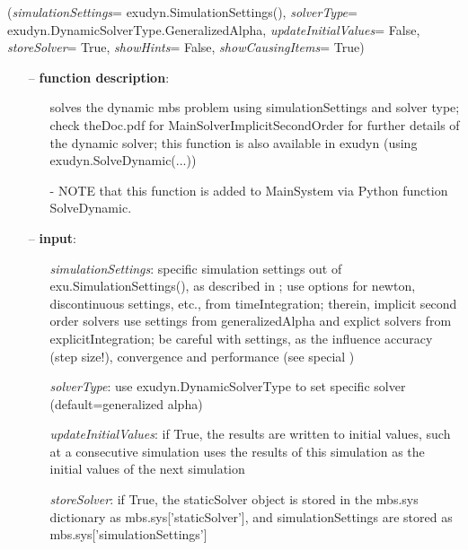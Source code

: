%
\begin{flushleft}
\label{sec:mainsystemextensions:SolveDynamic}
({\it simulationSettings}= exudyn.SimulationSettings(), {\it solverType}= exudyn.DynamicSolverType.GeneralizedAlpha, {\it updateInitialValues}= False, {\it storeSolver}= True, {\it showHints}= False, {\it showCausingItems}= True)
\end{flushleft}
\setlength{\itemindent}{0.7cm}
\begin{itemize}[leftmargin=0.7cm]
\item[--]
{\bf function description}: \vspace{-6pt}
\begin{itemize}[leftmargin=1.2cm]
\setlength{\itemindent}{-0.7cm}
\item[]solves the dynamic mbs problem using simulationSettings and solver type; check theDoc.pdf for MainSolverImplicitSecondOrder for further details of the dynamic solver; this function is also available in exudyn (using exudyn.SolveDynamic(...))
\item[]- NOTE that this function is added to MainSystem via Python function SolveDynamic.
\end{itemize}
\item[--]
{\bf input}: \vspace{-6pt}
\begin{itemize}[leftmargin=1.2cm]
\setlength{\itemindent}{-0.7cm}
\item[]{\it simulationSettings}: specific simulation settings out of exu.SimulationSettings(), as described in ; use options for newton, discontinuous settings, etc., from timeIntegration; therein, implicit second order solvers use settings from generalizedAlpha and explict solvers from explicitIntegration; be careful with settings, as the influence accuracy (step size!), convergence and performance (see special )
\item[]{\it solverType}: use exudyn.DynamicSolverType to set specific solver (default=generalized alpha)
\item[]{\it updateInitialValues}: if True, the results are written to initial values, such at a consecutive simulation uses the results of this simulation as the initial values of the next simulation
\item[]{\it storeSolver}: if True, the staticSolver object is stored in the mbs.sys dictionary as mbs.sys['staticSolver'], and simulationSettings are stored as mbs.sys['simulationSettings']

\end{itemize}
\end{itemize}
